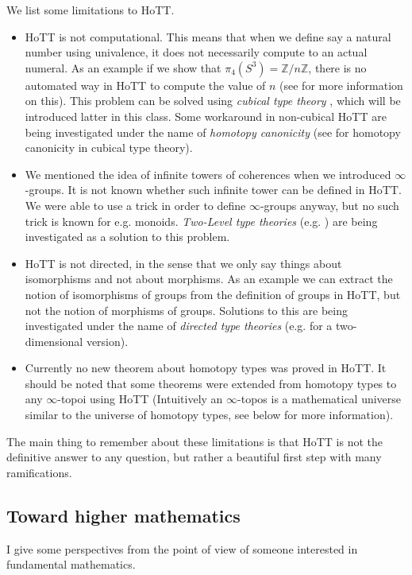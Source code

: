 \documentclass{article}
\newcommand{\sse}[1]{\medbreak \subsection{#1}}
\begin{document}
\noindent We list some limitations to HoTT. %
\begin{itemize}
\item HoTT is not computational. This means that when we define say a natural number using univalence, it does not necessarily compute to an actual numeral. As an example if we show that $\pi_4(S^3) = \mathbb{Z}/n\mathbb{Z}$, there is no automated way in HoTT to compute the value of $n$ (see \cite{brunerie2016groupes} for more information on this). This problem can be solved using \emph{cubical type theory} \cite{cohen2016cubical}, which will be introduced latter in this class. Some workaround in non-cubical HoTT are being investigated under the name of \emph{homotopy canonicity} (see \cite{coquand2019homotopy} for homotopy canonicity in cubical type theory).
\item We mentioned the idea of infinite towers of coherences when we introduced $\infty$-groups. It is not known whether such infinite tower can be defined in HoTT. We were able to use a trick in order to define $\infty$-groups anyway, but no such trick is known for e.g. monoids. \emph{Two-Level type theories} (e.g. \cite{annenkov2017two}) are being investigated as a solution to this problem.
\item HoTT is not directed, in the sense that we only say things about isomorphisms and not about morphisms. As an example we can extract the notion of isomorphisms of groups from the definition of groups in HoTT, but not the notion of morphisms of groups. Solutions to this are being investigated under the name of \emph{directed type theories} (e.g. \cite{licata2012} for a two-dimensional version).
\item Currently no new theorem about homotopy types was proved in HoTT. It should be noted that some theorems were extended from homotopy types to any $\infty$-topoi using HoTT (Intuitively an $\infty$-topos is a mathematical universe similar to the universe of homotopy types, see below for more information).
\end{itemize}

\noindent The main thing to remember about these limitations is that HoTT is not the definitive answer to any question, but rather a beautiful first step with many ramifications.


\sse{Toward higher mathematics}

I give some perspectives from the point of view of someone interested in fundamental mathematics. %
\end{document}
